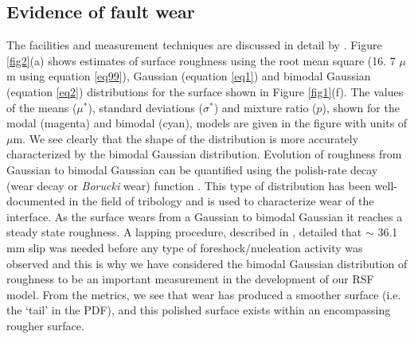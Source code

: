 \documentclass[preprint,1p, 10pt,authoryear]{elsarticle}
\begin{document}
\subsection{Evidence of fault wear}
\label{SurfaceWear}
The facilities and measurement techniques are discussed in detail by \citet{Selvadurai2017}.  Figure \ref{fig2}(a) shows estimates of surface roughness using the root mean square (16. 7 $\mu$m using equation \eqref{eq99}), Gaussian (equation \eqref{eq1}) and bimodal Gaussian (equation \eqref{eq2}) distributions for the surface shown in Figure \ref{fig1}(f). The values of the means ($\mu^{*}$), standard deviations ($\sigma^{*}$) and mixture ratio ($p$), shown for the modal (magenta) and bimodal (cyan), models are given in the figure with units of $\mu$m.  We see clearly that the shape of the distribution is more accurately characterized by the bimodal Gaussian distribution.  Evolution of roughness from Gaussian to bimodal Gaussian can be quantified using the polish-rate decay (wear decay or \textit{Borucki} wear) function \citep{Adachi2000, Borucki2002, Borucki2004, Ciavarella2016,He2017,Hu2019}. This type of distribution has been well-documented in the field of tribology and is used to characterize wear of the interface. As the surface wears from a Gaussian to bimodal Gaussian it reaches a steady state roughness.  A lapping procedure, described in \citet{Selvadurai2015}, detailed that $\sim$ 36.1 mm slip was needed before any type of foreshock/nucleation activity was observed and this is why we have considered the bimodal Gaussian distribution of roughness to be an important measurement in the development of our RSF model.  From the metrics, we see that wear has produced a smoother surface (i.e.  the `tail' in the PDF), and this polished surface exists within an encompassing rougher surface.     
\end{document}
